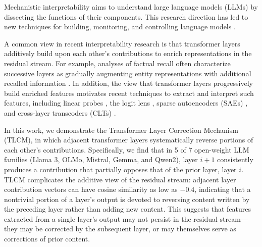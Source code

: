 
Mechanistic interpretability aims to understand large language models (LLMs) by dissecting the functions 
of their components. This research direction has led to new techniques for building, monitoring, and controlling language models \citep{quirkylm, roger2023benchmarks, li2023inference, feng2024monitoring, pan2024latentqa, xiao2023efficient, wu2024reft}.


A common view in recent interpretability research is that transformer layers additively build upon each other's contributions to enrich representations in the residual stream. For example, analyses of factual recall often characterize successive layers as gradually augmenting entity representations with additional recalled information \citep{geva2023dissectingrecallfactualassociations, rome, nanda2023fact, hernandez2024linearity}. In addition, the view that transformer layers progressively build enriched features motivates recent techniques to extract and interpret such features, including linear probes \citep{alain2016understanding}, the logit lens \citep{nostalgebraist}, sparse autoencoders (SAEs) \citep{bricken2023monosemanticity}, and cross-layer transcoders (CLTs) \citep{ameisen2025circuit, dunefsky2024transcodersinterpretablellmfeature, paulo2025transcodersbeatsparseautoencoders}.


In this work, we demonstrate the Transformer Layer Correction Mechanism (TLCM), in which adjacent transformer layers systematically reverse portions of each other's contributions. Specifically, we find that in 5 of 7 open-weight LLM families (Llama 3, OLMo, Mistral, Gemma, and Qwen2), layer $i+1$ consistently produces a contribution that partially opposes that of the prior layer, layer $i$. TLCM complicates the additive view of the residual stream: adjacent layer contribution vectors can have cosine similarity as low as $-0.4$, indicating that a nontrivial portion of a layer's output is devoted to reversing content written by the preceding layer rather than adding new content. This suggests that features extracted from a single layer's output may not persist in the residual stream---they may be corrected by the subsequent layer, or may themselves serve as corrections of prior content.

